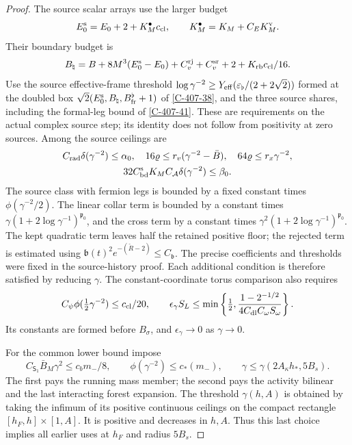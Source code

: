 \documentclass[11pt,letterpaper,reqno]{amsart}
\theoremstyle{definition}
\theoremstyle{remark}
\begin{document}
\begin{proof}
The source scalar arrays use the larger budget
\[
 E_0^{\rm s}=E_0+2+K_M^\bullet c_{\rm cl},\qquad
 K_M^\bullet=K_M+C_EK_M^{\rm v}.
\]
Their boundary budget is
\[
 B_\natural=B+8M^3(E_0^{\rm s}-E_0)
          +C_v^{\rm rj}+C_v^{\rm sr}+2+K_{\rm rb}c_{\rm cl}/16.
\]
Use the source effective-frame threshold
$\log\gamma^{-2}\ge Y_{\rm eff}(\varepsilon_\flat/(2+2\sqrt2))$
formed at the doubled box
$\sqrt2(E_0^{\rm s},B_\natural,B_{\rm fr}^{\flat}+1)$
of \cref{C-407-38}, and the three source shares, including
the formal-leg bound of \cref{C-407-41}. These are
requirements on the actual complex source step; its identity
does not follow from positivity at zero sources.
Among the source ceilings are
\[
\begin{gathered}
 C_{\rm rad}\delta(\gamma^{-2})\le\alpha_0,\quad
 16\varrho\le r_v(\gamma^{-2}-\bar B),\quad
 64\varrho\le r_x\gamma^{-2},\\
 32C_{\rm bd}^{\rm s}K_M C_{\mathcal A}
                         \delta(\gamma^{-2})\le\beta_0.
\end{gathered}
\]
The source class with fermion legs is bounded by a fixed
constant times $\phi(\gamma^{-2}/2)$. The linear collar
term is bounded by a constant times
$\gamma(1+2\log\gamma^{-1})^{\mathfrak p_0}$, and the
cross term by a constant times
$\gamma^2(1+2\log\gamma^{-1})^{\mathfrak p_0}$.
The kept quadratic term leaves half the retained positive
floor; the rejected term is estimated using
$\mathfrak b(t)^2e^{-(\check R-2)}\le C_{\mathfrak b}$.
The precise coefficients and thresholds were fixed in the
source-history proof. Each additional condition is therefore
satisfied by reducing $\gamma$.
The constant-coordinate torus comparison also requires
\[
 C_\psi\phi(\tfrac12\gamma^{-2})\le c_{\rm cl}/20,\qquad
 \epsilon_\gamma S_L\le
 \min\left\{\tfrac12,
       \frac{1-2^{-1/2}}{4C_{\rm dl}C_\omega S_\omega}\right\}.
\]
Its constants are formed before $B_\sigma$, and
$\epsilon_\gamma\to0$ as $\gamma\to0$.

For the common lower bound impose
\[
 C_{\mathsf S_1}\bar B_M\gamma^2\le c_bm_-/8,
 \qquad \phi(\gamma^{-2})\le c_*(m_-),
 \qquad \gamma\le\gamma(2A_\kappa h_*,5B_s).
\]
The first pays the running mass member; the second pays
the activity bilinear and the last interacting forest
expansion. The threshold $\gamma(h,A)$ is obtained by
taking the infimum of its positive continuous ceilings
on the compact rectangle $[h_F,h]\times[1,A]$.
It is positive and decreases in $h,A$. Thus this last
choice implies all earlier uses at $h_F$ and radius $5B_s$.


\end{proof}
\end{document}
